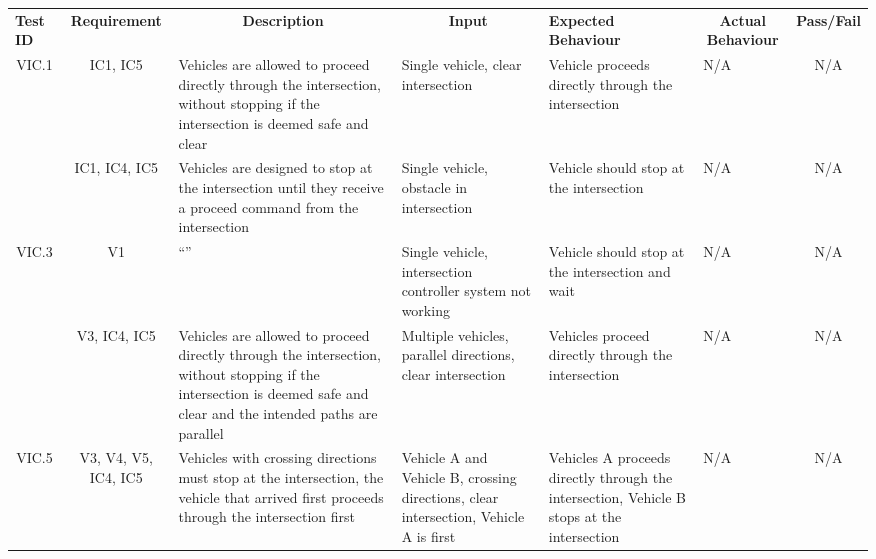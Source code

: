 \documentclass [10pt]{article}
\begin{document}
 \begin{longtable}{ | p{ } | p{ } |  p{ } |  p{ } | p{ } | p{ } |  p{ } |}  \hline

    \rowcolor{subsectionC}\textbf{Test ID}
    & \multicolumn{1}{c|}{\textbf{Requirement} }
    &\multicolumn{1}{c|}{\textbf{Description} }
    & \multicolumn{1}{c|}{\textbf{Input} }
    & \textbf{Expected Behaviour} 
    & \multicolumn{1}{c|}{\textbf{Actual Behaviour} }
    & \multicolumn{1}{c|}{\textbf{Pass/Fail}} \\  
    
    \multicolumn{1}{|c|}{VIC.1} 
    & \multicolumn{1}{c|}{IC1, IC5}
    &Vehicles are allowed to proceed directly through the intersection, without stopping if the intersection is deemed safe and clear
    & Single vehicle, clear intersection
    & Vehicle proceeds directly through the intersection
    & N/A 
    & \multicolumn{1}{c|}{N/A}\\ \hline
    
    \newpage\hline
    
    \rowcolor{tableCell}\multicolumn{1}{|c|}{VIC.2} 
    & \multicolumn{1}{c|}{IC1, IC4, IC5}
    & Vehicles are designed to stop at the intersection until they receive a proceed command from the intersection    
    & Single vehicle, obstacle in intersection
    & Vehicle should stop at the intersection
    & N/A
    & \multicolumn{1}{c|}{N/A}\\ 
    
    \multicolumn{1}{|c|}{VIC.3} 
    & \multicolumn{1}{c|}{V1}
    & ``''
    
    & Single vehicle, intersection controller system not working
    &  Vehicle should stop at the intersection and wait
    & N/A
    & \multicolumn{1}{c|}{N/A}\\ 
    
    
        \rowcolor{tableCell}\multicolumn{1}{|c|}{VIC.4} 
    & \multicolumn{1}{c|}{V3, IC4, IC5}
    & Vehicles are allowed to proceed directly through the intersection, without stopping if the intersection is deemed safe and clear and the intended paths are parallel
    & Multiple vehicles, parallel directions, clear intersection
    & Vehicles proceed directly through the intersection
    &  N/A
    & \multicolumn{1}{c|}{N/A}\\ 
    
    \multicolumn{1}{|c|}{VIC.5} 
    & \multicolumn{1}{c|}{V3, V4, V5, IC4, IC5}
    & Vehicles with crossing directions must stop at the intersection, the vehicle that arrived first proceeds through the intersection first
    &  Vehicle A and Vehicle B, crossing directions, clear intersection, Vehicle A is first
    &Vehicles A proceeds directly through the intersection, Vehicle B stops at the intersection 
    & N/A 
    & \multicolumn{1}{c|}{N/A}\\ 
    

\end{longtable}
\end{document}
